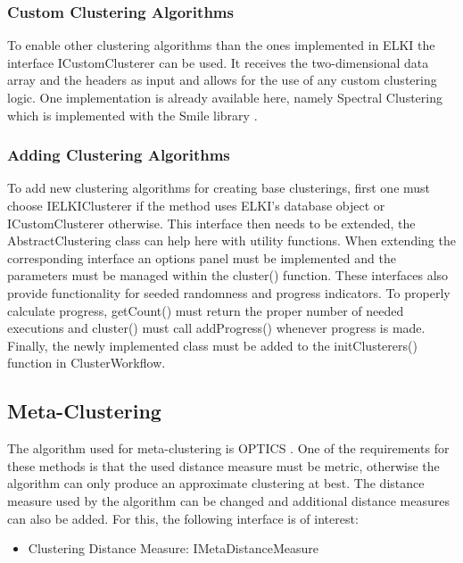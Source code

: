 \documentclass[
	a4paper,
	english,
	twoside,
	openright,               
	11pt                            
	]{report}
\begin{document}
\subsubsection{Custom Clustering Algorithms}
To enable other clustering algorithms than the ones implemented in ELKI the interface ICustomClusterer can be used. It receives the two-dimensional data array and the headers as input and allows for the use of any custom clustering logic. One implementation is already available here, namely Spectral Clustering which is implemented with the Smile library \cite{javasmile}.
 
\subsubsection*{Adding Clustering Algorithms}
To add new clustering algorithms for creating base clusterings, first one must choose IELKIClusterer if the method uses ELKI's database object or ICustomClusterer otherwise. This interface then needs to be extended, the AbstractClustering class can help here with utility functions. When extending the corresponding interface an options panel must be implemented and the parameters must be managed within the cluster() function. These interfaces also provide functionality for seeded randomness and progress indicators. To properly calculate progress, getCount() must return the proper number of needed executions and cluster() must call addProgress() whenever progress is made. Finally, the newly implemented class must be added to the initClusterers() function in ClusterWorkflow.


\subsection{Meta-Clustering}
The algorithm used for meta-clustering is OPTICS \cite{10.1145/304181.304187}. One of the requirements for these methods is that the used distance measure must be metric, otherwise the algorithm can only produce an approximate clustering at best. The distance measure used by the algorithm can be changed and additional distance measures can also be added. For this, the following interface is of interest:

\begin{itemize}
  \item Clustering Distance Measure: IMetaDistanceMeasure
\end{itemize}
\end{document}
